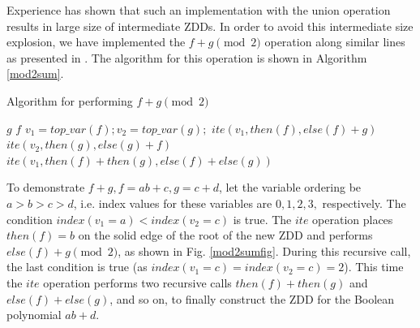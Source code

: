 Experience has shown that such an implementation with the
union operation results in large size of intermediate ZDDs. In order
to avoid this intermediate size explosion, we have implemented the
$f+g\pmod 2$ operation along similar lines as presented in
\cite{polybori:2009}. The algorithm for this operation is shown in
Algorithm \ref{mod2sum}.  

\begin{algorithm}
\caption{Algorithm for performing $f+g\pmod 2$}
\label{mod2sum}
\begin{algorithmic}[1]
{\small
{}
\State \Return $g$
\State \Return $f$
\State {}
\Else
\State $v_1 = top\_var(f); v_2 = top\_var(g);$
\State \Return ${\mathit{ite}}(v_1,then(f),else(f)+g)$
\State \Return ${\mathit{ite}}(v_2,then(g),else(g)+f)$
\Else
\State \Return ${\mathit{ite}}(v_1,then(f) + then(g),else(f)+else(g))$
\EndIf


\EndIf
\EndProcedure
}
\end{algorithmic}
\end{algorithm}


\begin{Example}
To demonstrate $f+g, f = ab+c, g = c+d$, let the variable ordering be
$a>b>c>d$, i.e. index values for these variables are $0,1,2,3,$
respectively. The condition $index(v_1=a) < index(v_2=c)$ is true. The 
${\mathit{ite}}$ operation places $then(f) = b$ on the solid edge of the root of
the new ZDD and performs $else(f) + g \pmod2$, as shown in 
Fig. \ref{mod2sumfig}. During this recursive call, the last condition
is true  (as $index(v_1=c) = index(v_2=c) = 2$). This time the  ${\mathit{ite}}$
operation performs two recursive calls $then(f) + then(g)$ and
$else(f) + else(g)$, and so on, to finally construct the ZDD for the
Boolean polynomial $ab+d$.

 
\end{Example}

